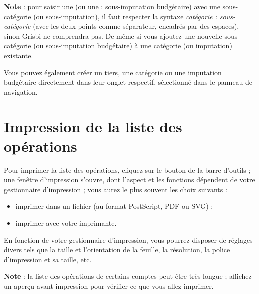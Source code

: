 \textbf{Note} : pour saisir une 
 (ou une  : sous-imputation budgétaire) avec une sous-catégorie (ou sous-imputation), il faut respecter la syntaxe \emph{catégorie : sous-catégorie} (avec les deux points comme séparateur, encadrés par des espaces), sinon Grisbi ne comprendra pas. De même si vous ajoutez une nouvelle sous-catégorie (ou sous-imputation budgétaire) à une catégorie (ou imputation) existante.

Vous pouvez également créer un tiers, une catégorie ou une imputation budgétaire directement dans leur onglet respectif, sélectionné dans le panneau de navigation.


\section{Impression de la liste des opérations\label{transactions-print}}


Pour imprimer la liste des opérations, cliquez sur le bouton  de la barre d'outils ; une fenêtre d'impression s'ouvre, dont l'aspect et les fonctions dépendent de votre gestionnaire d'impression ; vous aurez le plus souvent les choix suivants :

\begin{itemize}
	\item imprimer dans un fichier (au format \gls{PostScript}, \gls{PDF} ou \gls{SVG}) ;
	\item imprimer avec votre imprimante.
\end{itemize}

En fonction de votre gestionnaire d'impression, vous pourrez disposer de réglages divers tels que la taille et l'orientation de la feuille, la résolution, la police d'impression et sa taille, etc.

\textbf{Note} : la liste des opérations de certains comptes peut être très longue ; affichez un aperçu avant impression pour vérifier ce que vous allez imprimer.


